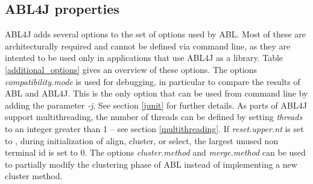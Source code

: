 \documentclass[12pt,a4paper]{article}
\newcommand{\code}[1]{{\ttfamily\selectfont{#1}}}
\begin{document}
\subsection{ABL4J properties}\label{custom_properties}
ABL4J adds several options to the set of options used by ABL. Most of these are
architecturally required and cannot be defined via command line, as they are
intented to be used only in applications that use ABL4J as a library. Table
\ref{additional_options} gives an overview of these options.
The options \emph{compatibility.mode} is used for debugging, in particular to
compare the results of ABL and ABL4J. This is the only option that can be used
from command line by adding the parameter \emph{-j}. See section \ref{junit}
for further details. As parts of ABL4J support multithreading, the number of
threads can be defined by setting \emph{threads} to an integer greater than 1
-- see section \ref{multithreading}. If \emph{reset.upper.nt} is set to
\code{true}, during initialization of align, cluster, or select, the largest
unused non terminal id is set to 0. The options \emph{cluster.method} and
\emph{merge.method} can be used to partially modify the clustering phase of ABL
instead of implementing a new cluster method.
\end{document}
